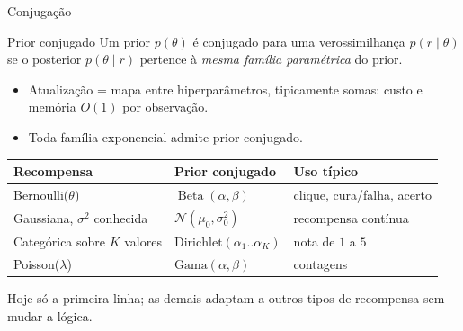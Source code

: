 \documentclass[aspectratio=169, 11pt]{beamer}
\newcommand{\Bdist}{\operatorname{Beta}}
\newcommand{\Nrm}{\mathcal{N}}
\begin{document}
\begin{frame}{Conjugação}
  \begin{defbox}{Prior conjugado}
    Um prior $p(\theta)$ é \alert{conjugado} para uma verossimilhança
    $p(r \mid \theta)$ se o posterior $p(\theta \mid r)$ pertence à
    \emph{mesma família paramétrica} do prior.
  \end{defbox}

  \begin{itemize}
    \item Atualização = mapa entre hiperparâmetros, tipicamente somas:
          custo e memória $O(1)$ por observação.
    \item Toda família exponencial admite prior conjugado.
  \end{itemize}

  \smallskip
  \begin{center}\scriptsize
  \begin{tabular}{@{}lll@{}}
    \toprule
    \textbf{Recompensa} & \textbf{Prior conjugado} & \textbf{Uso típico} \\
    \midrule
    Bernoulli($\theta$)            & $\Bdist(\alpha,\beta)$ & clique, cura/falha, acerto \\
    Gaussiana, $\sigma^2$ conhecida & $\Nrm(\mu_0,\sigma_0^2)$ & recompensa contínua \\
    Categórica sobre $K$ valores   & $\mathrm{Dirichlet}(\alpha_1..\alpha_K)$ & nota de $1$ a $5$ \\
    Poisson($\lambda$)             & $\mathrm{Gama}(\alpha,\beta)$ & contagens \\
    \bottomrule
  \end{tabular}
  \end{center}

  \smallskip
  {\small\color{rlCinza} Hoje só a primeira linha; as demais adaptam a
  outros tipos de recompensa sem mudar a lógica.}
\end{frame}
\end{document}
